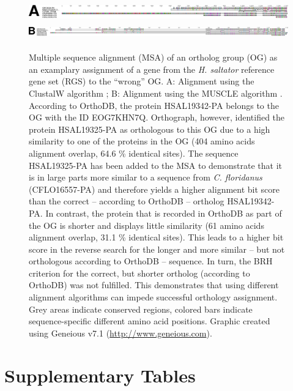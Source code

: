 \newpage

\begin{figure}
\includegraphics[height=2em]{figures/alignment-clustalw.pdf}\\
\includegraphics[height=2em]{figures/alignment-muscle.pdf}
\caption[Multiple sequence alignments of an ortholog group]{%
Multiple sequence alignment (MSA) of an ortholog group (OG) as an
examplary assignment of a gene from the \emph{H. saltator} reference
gene set (RGS) to the ``wrong'' OG.  A: Alignment using the ClustalW
algorithm \citep{Thompson1994}; B: Alignment using the MUSCLE algorithm
\citep{Edgar2004}.  According to OrthoDB, the protein HSAL19342-PA
belongs to the OG with the ID EOG7KHN7Q.  Orthograph, however,
identified the protein HSAL19325-PA as orthologous to this OG due to a
high similarity to one of the proteins in the OG (404 amino acids
alignment overlap, 64.6 \% identical sites).  The sequence HSAL19325-PA
has been added to the MSA to demonstrate that it is in large parts more
similar to a sequence from \emph{C. floridanus} (CFLO16557-PA) and
therefore yields a higher alignment bit score than the correct --
according to OrthoDB -- ortholog HSAL19342-PA.  In contrast, the protein
that is recorded in OrthoDB as part of the OG is shorter and displays
little similarity (61 amino acids alignment overlap, 31.1 \% identical
sites).  This leads to a higher bit score in the reverse search for the
longer and more similar -- but not orthologous according to OrthoDB --
sequence.  In turn, the BRH criterion for the correct, but shorter
ortholog (according to OrthoDB) was not fulfilled.  This demonstrates
that using different alignment algorithms can impede successful
orthology assignment.  Grey areas indicate conserved regions, colored
bars indicate sequence-specific different amino acid positions.  Graphic
created using Geneious v7.1 (\url{http://www.geneious.com}).}%
\label{fig:orthodb-alignments}
\end{figure}

\newpage

\section{Supplementary Tables}

